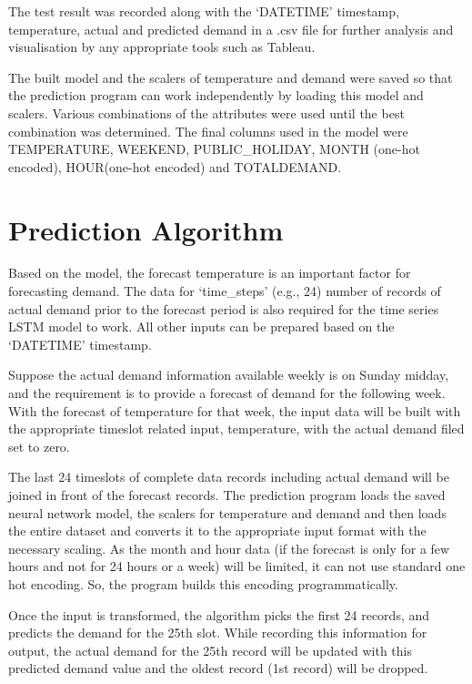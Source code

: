 \documentclass[mstat,12pt]{unswthesis}
\begin{document}
\bigskip

The test result was recorded along with the `DATETIME' timestamp,
temperature, actual and predicted demand in a .csv file for further
analysis and visualisation by any appropriate tools such as Tableau.

\bigskip

The built model and the scalers of temperature and demand were saved so
that the prediction program can work independently by loading this model
and scalers. Various combinations of the attributes were used until the
best combination was determined. The final columns used in the model
were TEMPERATURE, WEEKEND, PUBLIC\_HOLIDAY, MONTH (one-hot encoded),
HOUR(one-hot encoded) and TOTALDEMAND.

\bigskip

\hypertarget{prediction-algorithm}{%
\section{Prediction Algorithm}\label{prediction-algorithm}}

Based on the model, the forecast temperature is an important factor for
forecasting demand. The data for `time\_steps' (e.g., 24) number of
records of actual demand prior to the forecast period is also required
for the time series LSTM model to work. All other inputs can be prepared
based on the `DATETIME' timestamp.

\bigskip

Suppose the actual demand information available weekly is on Sunday
midday, and the requirement is to provide a forecast of demand for the
following week. With the forecast of temperature for that week, the
input data will be built with the appropriate timeslot related input,
temperature, with the actual demand filed set to zero.

\bigskip

The last 24 timeslots of complete data records including actual demand
will be joined in front of the forecast records. The prediction program
loads the saved neural network model, the scalers for temperature and
demand and then loads the entire dataset and converts it to the
appropriate input format with the necessary scaling. As the month and
hour data (if the forecast is only for a few hours and not for 24 hours
or a week) will be limited, it can not use standard one hot encoding.
So, the program builds this encoding programmatically.

\bigskip

Once the input is transformed, the algorithm picks the first 24 records,
and predicts the demand for the 25th slot. While recording this
information for output, the actual demand for the 25th record will be
updated with this predicted demand value and the oldest record (1st
record) will be dropped.
\end{document}
